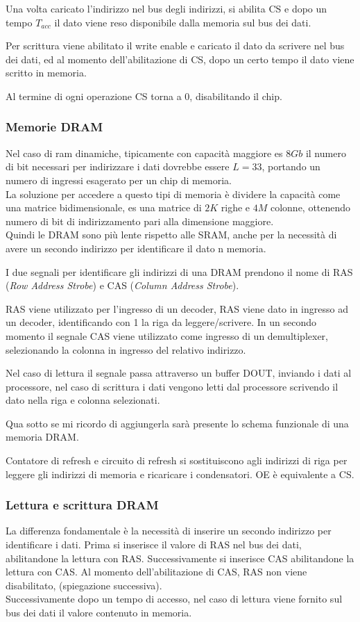 \documentclass[../template]{subfiles}
\begin{document}
Una volta caricato l'indirizzo nel bus degli indirizzi, si abilita CS e dopo un tempo $T_{acc}$ il dato viene reso disponibile dalla memoria sul bus dei dati.

Per scrittura viene abilitato il write enable e caricato il dato da scrivere nel bus dei dati, ed al momento dell'abilitazione di CS, dopo un certo tempo il dato viene scritto in memoria.

Al termine di ogni operazione CS torna a 0, disabilitando il chip.
\subsubsection{Memorie DRAM}
Nel caso di ram dinamiche, tipicamente con capacità maggiore es $8Gb$ il numero di bit necessari per indirizzare i dati dovrebbe essere $L=33$, portando un numero di ingressi esagerato per un chip di memoria.
\\
La soluzione per accedere a questo tipi di memoria è dividere la capacità come una matrice bidimensionale, es una matrice di $2K$ righe e $4M$ colonne, ottenendo numero di bit di indirizzamento pari alla dimensione maggiore.
\\
Quindi le DRAM sono più lente rispetto alle SRAM, anche per la necessità di avere un secondo indirizzo per identificare il dato n memoria.

I due segnali per identificare gli indirizzi di una DRAM prendono il nome di RAS (\textit{Row Address Strobe}) e CAS (\textit{Column Address Strobe}).

RAS viene utilizzato per l'ingresso di un decoder,
RAS viene dato in ingresso ad un decoder, identificando con 1 la riga da leggere/scrivere. In un secondo momento il segnale CAS viene utilizzato come ingresso di un demultiplexer, selezionando la colonna in ingresso del relativo indirizzo.

Nel caso di lettura il segnale passa attraverso un buffer DOUT, inviando i dati al processore, nel caso di scrittura i dati vengono letti dal processore scrivendo il dato nella riga e colonna selezionati.

Qua sotto se mi ricordo di aggiungerla sarà presente lo schema funzionale di una memoria DRAM.

Contatore di refresh e circuito di refresh si sostituiscono agli indirizzi di riga per leggere gli indirizzi di memoria e ricaricare i condensatori.
OE è equivalente a CS.

\subsubsection{Lettura e scrittura DRAM}
La differenza fondamentale è la necessità di inserire un secondo indirizzo per identificare i dati.
Prima si inserisce il valore di RAS nel bus dei dati, abilitandone la lettura con RAS. Successivamente si inserisce CAS abilitandone la lettura con CAS. Al momento dell'abilitazione di CAS, RAS non viene disabilitato, (spiegazione successiva).
\\
Successivamente dopo un tempo di accesso, nel caso di lettura viene fornito sul bus dei dati il valore contenuto in memoria.
\end{document}
